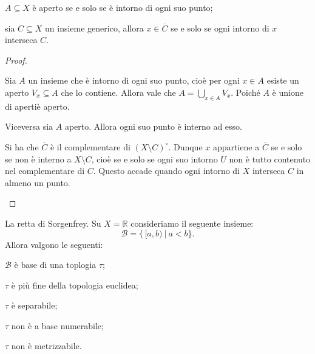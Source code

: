 \documentclass{article}
\begin{document}
\begin{prop}
	\begin{nlist}
		\item $A \subseteq X$ è aperto se e solo se è intorno di ogni suo punto;
		\item sia $C \subseteq X$ un insieme generico, allora $x \in
		\overline{C}$ se e solo se ogni intorno di $x$ interseca $C$.
	\end{nlist}
\end{prop}

\begin{proof}
\begin{nlist}
\item Sia $A$ un insieme che \`e intorno di ogni suo punto, cio\`e per ogni $x
\in A$ esiste un aperto $V_x \subseteq A$ che lo contiene. Allora vale che $A =
\bigcup_{x \in A} V_x$. Poiché $A$ \`e unione di aperti\`e aperto.

Viceversa sia $A$ aperto. Allora ogni suo punto \`e interno ad esso.

\item Si ha che $\overline{C}$ \`e il complementare di $(X\setminus C)^\circ$.
Dunque $x$ appartiene a $\overline{C}$ se e solo se non \`e interno a $X
\setminus C$, cioè se e solo se ogni suo intorno $U$ non \`e tutto contenuto nel
complementare di $C$. Questo accade quando ogni intorno di $X$ interseca $C$ in
almeno un punto.

\end{nlist}
\end{proof}

\begin{ex}
	La retta di Sorgenfrey. Su $X=\mathbb{R}$ consideriamo il seguente insieme:
	$${\mathcal{B}=\{\,[a, b)\ |\ a<b\}}.$$
    Allora valgono le seguenti:
	\begin{nlist}
		\item $\mathcal{B}$ è base di una toplogia $\tau$;
		\item $\tau$ \`e pi\`u fine della topologia euclidea;
		\item $\tau$ è separabile;
		\item $\tau$ non è a base numerabile;
		\item $\tau$ non è metrizzabile.
	\end{nlist}
\end{ex}
\end{document}
